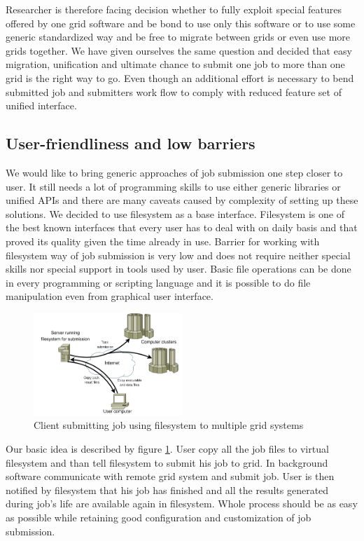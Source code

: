 \documentclass[a4paper,10pt,twocolumn]{article}
\begin{document}
Researcher is therefore facing decision whether to fully exploit special features offered by one grid software and be bond to use only this software or to use some generic standardized way and be free to migrate between grids or even use more grids together. We have given ourselves the same question and decided that easy migration, unification and ultimate chance to submit one job to more than one grid is the right way to go. Even though an additional effort is necessary to bend submitted job and submitters work flow to comply with reduced feature set of unified interface.


\subsection{User-friendliness and low barriers}
We would like to bring generic approaches of job submission one step closer to user. It still needs a lot of programming skills to use either generic libraries or unified APIs and there are many caveats caused by complexity of setting up these solutions. We decided to use filesystem as a base interface. Filesystem is one of the best known interfaces that every user has to deal with on daily basis and that proved its quality given the time already in use. Barrier for working with filesystem way of job submission is very low and does not require neither special skills nor special support in tools used by user. Basic file operations can be done in every programming or scripting language and it is possible to do file manipulation even from graphical user interface.

\begin{figure}[t]
 \includegraphics[keepaspectratio=true,width=0.5\textwidth,height=0.5\textheight]{./images/basic_structure.pdf}
 \caption{Client submitting job using filesystem to multiple grid systems}
 \label{basic_structure}
\end{figure}


Our basic idea is described by figure \ref{basic_structure}. User copy all the job files to virtual filesystem and than tell filesystem to submit his job to grid. In background software communicate with remote grid system and submit job. User is then notified by filesystem that his job has finished and all the results generated during job's life are available again in filesystem. Whole process should be as easy as possible while retaining good configuration and customization of job submission. 
\end{document}
